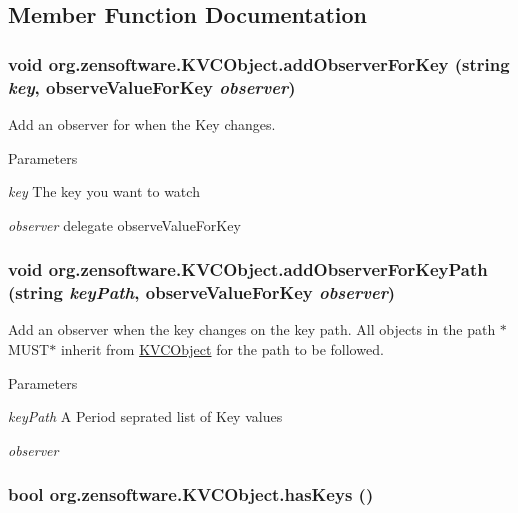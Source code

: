 \subsection{Member Function Documentation}
\hypertarget{classorg_1_1zensoftware_1_1_k_v_c_object_ac2e48f92639d9dae571593b9e257ee35}{
\subsubsection[{addObserverForKey}]{\setlength{\rightskip}{0pt plus 5cm}void org.zensoftware.KVCObject.addObserverForKey (string {\em key}, \/  observeValueForKey {\em observer})}}
\label{classorg_1_1zensoftware_1_1_k_v_c_object_ac2e48f92639d9dae571593b9e257ee35}


Add an observer for when the Key changes. 
\begin{DoxyParams}{Parameters}
\item[{\em key}]The key you want to watch\item[{\em observer}]delegate observeValueForKey\end{DoxyParams}
\hypertarget{classorg_1_1zensoftware_1_1_k_v_c_object_acb8012bb3496be1e346873d0900fdc1b}{
\subsubsection[{addObserverForKeyPath}]{\setlength{\rightskip}{0pt plus 5cm}void org.zensoftware.KVCObject.addObserverForKeyPath (string {\em keyPath}, \/  observeValueForKey {\em observer})}}
\label{classorg_1_1zensoftware_1_1_k_v_c_object_acb8012bb3496be1e346873d0900fdc1b}


Add an observer when the key changes on the key path. All objects in the path $\ast$MUST$\ast$ inherit from \hyperlink{classorg_1_1zensoftware_1_1_k_v_c_object}{KVCObject} for the path to be followed. 
\begin{DoxyParams}{Parameters}
\item[{\em keyPath}]A Period seprated list of Key values\item[{\em observer}]\end{DoxyParams}
\hypertarget{classorg_1_1zensoftware_1_1_k_v_c_object_a992d4fa105d7f90c3d0aba1e5a4680ad}{
\subsubsection[{hasKeys}]{\setlength{\rightskip}{0pt plus 5cm}bool org.zensoftware.KVCObject.hasKeys ()}}
\label{classorg_1_1zensoftware_1_1_k_v_c_object_a992d4fa105d7f90c3d0aba1e5a4680ad}


